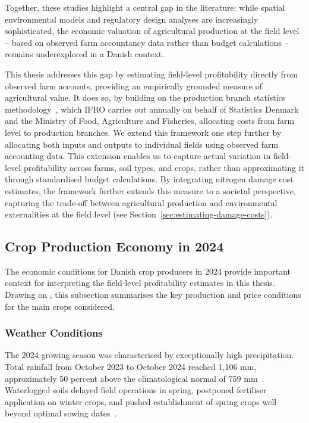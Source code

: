 \documentclass[12pt]{article}
\begin{document}
Together, these studies highlight a central gap in the literature: while spatial environmental models and regulatory design analyses are increasingly sophisticated, the economic valuation of agricultural production at the field level -- based on observed farm accountancy data rather than budget calculations -- remains underexplored in a Danish context. 
 
This thesis addresses this gap by estimating field-level profitability directly from observed farm accounts, providing an empirically grounded measure of agricultural value. It does so, by building on the production branch statistics methodology~\citep{henningsen2026}, which IFRO carries out annually on behalf of Statistics Denmark and the Ministry of Food, Agriculture and Fisheries, allocating costs from farm level to production branches. We extend this framework one step further by allocating both inputs and outputs to individual fields using observed farm accounting data. This extension enables us to capture actual variation in field-level profitability across farms, soil types, and crops, rather than approximating it through standardised budget calculations. By integrating nitrogen damage cost estimates, the framework further extends this measure to a societal perspective, capturing the trade-off between agricultural production and environmental externalities at the field level (see Section~\ref{sec:estimating-damage-costs}). \\[0.25cm]


\subsection{Crop Production Economy in 2024}

The economic conditions for Danish crop producers in 2024 provide important context for interpreting the field-level profitability estimates in this thesis. Drawing on \cite{bramsen2024}, this subsection summarises the key production and price conditions for the main crops considered.
  

\subsubsection{Weather Conditions}
\label{sec:Weather Conditions}
The 2024 growing season was characterised by exceptionally high precipitation. Total rainfall from October 2023 to October 2024 reached 1,106 mm, approximately 50 percent above the climatological normal of 759 mm~\citep{dmi2026}. 
Waterlogged soils delayed field operations in spring, postponed fertiliser application on winter crops, and pushed establishment of spring crops well beyond optimal sowing dates~\citep{bramsen2024}.
\end{document}
